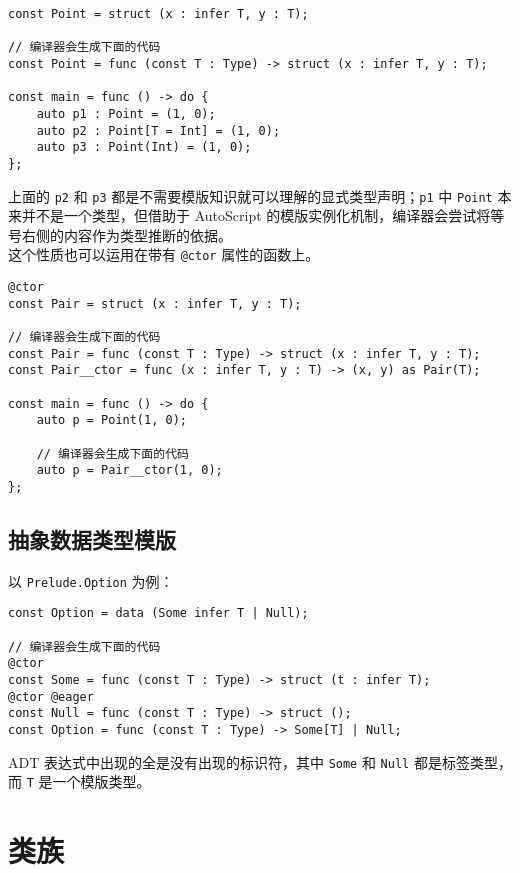 \begin{lstlisting}
const Point = struct (x : infer T, y : T);

// 编译器会生成下面的代码
const Point = func (const T : Type) -> struct (x : infer T, y : T);

const main = func () -> do {
	auto p1 : Point = (1, 0);
	auto p2 : Point[T = Int] = (1, 0);
	auto p3 : Point(Int) = (1, 0);
};
\end{lstlisting}

上面的 \lstinline!p2! 和 \lstinline!p3! 都是不需要模版知识就可以理解的显式类型声明；\lstinline!p1! 中 \lstinline!Point! 本来并不是一个类型，但借助于 AutoScript 的模版实例化机制，编译器会尝试将等号右侧的内容作为类型推断的依据。 \\

这个性质也可以运用在带有 \lstinline!@ctor! 属性的函数上。

\begin{lstlisting}
@ctor
const Pair = struct (x : infer T, y : T);

// 编译器会生成下面的代码
const Pair = func (const T : Type) -> struct (x : infer T, y : T);
const Pair__ctor = func (x : infer T, y : T) -> (x, y) as Pair(T);

const main = func () -> do {
	auto p = Point(1, 0);
	
	// 编译器会生成下面的代码
	auto p = Pair__ctor(1, 0);
};
\end{lstlisting}


\subsection{抽象数据类型模版}

以 \lstinline!Prelude.Option! 为例：

\begin{lstlisting}
const Option = data (Some infer T | Null);

// 编译器会生成下面的代码
@ctor
const Some = func (const T : Type) -> struct (t : infer T);
@ctor @eager
const Null = func (const T : Type) -> struct ();
const Option = func (const T : Type) -> Some[T] | Null;
\end{lstlisting}

ADT 表达式中出现的全是没有出现的标识符，其中 \lstinline!Some! 和 \lstinline!Null! 都是标签类型，而 \lstinline!T! 是一个模版类型。


\section{类族}


